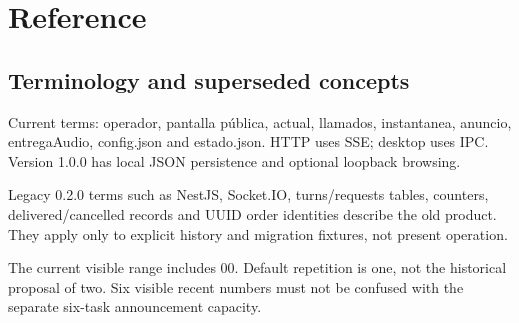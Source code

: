 \section{Reference}
\subsection{Terminology and superseded concepts}

Current terms: operador, pantalla pública, actual, llamados, instantanea, anuncio, entregaAudio, config.json and estado.json. HTTP uses SSE; desktop uses IPC. Version 1.0.0 has local JSON persistence and optional loopback browsing.

Legacy 0.2.0 terms such as NestJS, Socket.IO, turns/requests tables, counters, delivered/cancelled records and UUID order identities describe the old product. They apply only to explicit history and migration fixtures, not present operation.

The current visible range includes 00. Default repetition is one, not the historical proposal of two. Six visible recent numbers must not be confused with the separate six-task announcement capacity.
